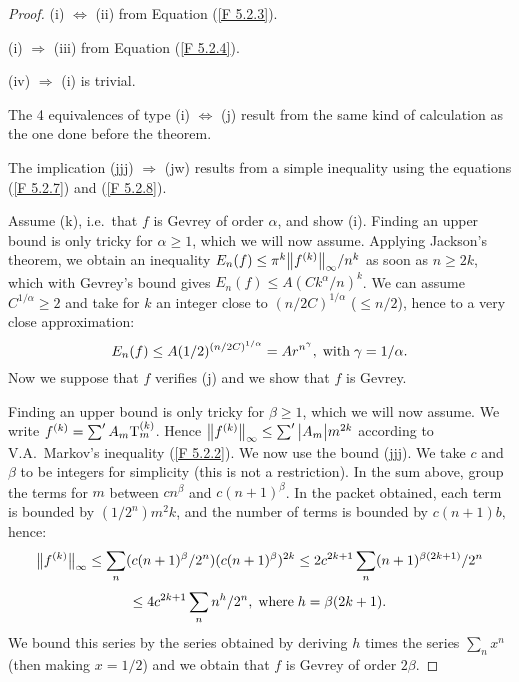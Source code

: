 %
\begin{proof}
(i) $\Leftrightarrow$ (ii) from Equation (\ref{F 5.2.3}). 

\noindent 
(i) $\Rightarrow$ (iii) from Equation (\ref{F 5.2.4}). 

\noindent 
(iv) $\Rightarrow$ (i) is trivial.

\noindent 
The 4 equivalences of type (i) $\Leftrightarrow$ (j) result from the same kind of calculation as the one done before the theorem.

\noindent 
The implication (jjj) $\Rightarrow$ (jw) results from a simple inequality  using the equations (\ref{F 5.2.7}) and (\ref{F 5.2.8}). 

\noindent 
Assume (k), i.e.\ that $f$ is Gevrey of order $\alpha$, and show (i). 
Finding an upper bound is only tricky for $\alpha \geq 1$, which we will now assume. Applying Jackson's theorem, we obtain an inequality $E_n(f) \leq \pi^{k} \big\lVert f^{(k)}  \big\rVert_{\infty} /n^k$
 as soon as $n \geq 2k$, which with Gevrey's bound gives $E_n(f) \leq A(Ck^{\alpha}/n)^k$. 
We can assume $C^{1/ \alpha} \geq 2$ and take for $k$ an integer close to $(n/2C)^{1/ \alpha}$ ($ \leq n/2$), hence to a very close approximation:
\[
E_n(f) \leq A(1/2)^{(n/2C)^{1/ \alpha}} = Ar^{n^{\gamma}}, \; {\rm with} \; \gamma = 1/ \alpha.
\]
Now we suppose that $f$ verifies (j) and we show that $f$ is Gevrey. 

\noindent 
Finding an upper bound is only tricky for $\beta \geq 1$, which we will now assume. We write $f^{(k)} = \sum' A_m {\rm T}_m^{(k)}$. 
Hence $\big\lVert f^{(k)}  \big\rVert_{\infty} \leq \sum' \big|{A_m}\big| m^{2k}$ according to V.A.\ Markov's inequality (\ref{F 5.2.2}). 
We now use the bound (jjj). We take $c$ and $\beta$ to be integers for simplicity (this is not a restriction). In the sum above, group the terms for $ m $ between $cn^{\beta}$ and $c(n+1)^{\beta}$. In the packet obtained, each term is bounded by $ (1/2^n) m^2k$, and the number of terms is bounded by $ c(n+1)b,$ hence:
\[
\big\lVert f^{(k)}  \big\rVert_\infty \leq \sum_n (c(n+1)^{\beta}/2^n)(c(n+1)^{\beta})^{2k} \leq 2c^{2k+1} \sum_n (n+1)^{\beta (2k+1)}/2^n
\]
\[
\leq 4c^{2k+1} \sum_n n^h/2^n, \; {\rm where} \; h = \beta(2k+1).
\] 
We bound this series by the series obtained by deriving $h$ times the series $\sum_n x^n$ (then making $x=1/2$) and we obtain that $f$ is Gevrey of order $2\beta$. 
\end{proof}



